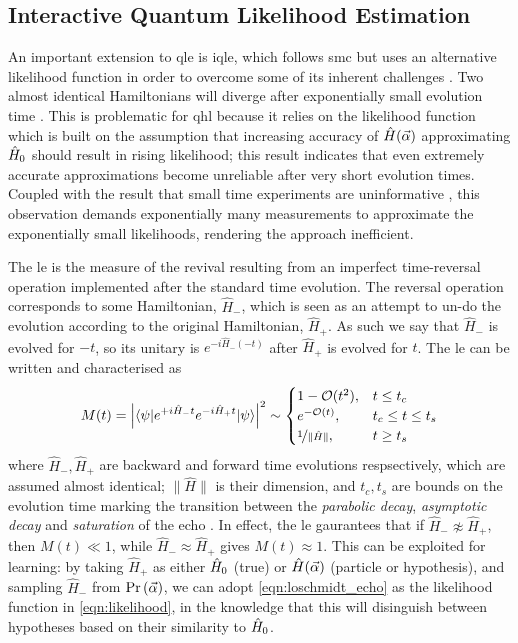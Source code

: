 \subsection{Interactive Quantum Likelihood Estimation}
An important extension to \gls{qle} is \gls{iqle}, 
    which follows \gls{smc} but uses an alternative \gls{likelihood} function in order to 
    overcome some of its inherent challenges \cite{Wiebe:2014qhl}. 
Two almost identical Hamiltonians will diverge after exponentially small evolution time \cite{jalabert2001environment}.
This is problematic for \gls{qhl} because it relies on the likelihood function which is built on the assumption 
    that increasing accuracy of $\hat{H}(\vec{\alpha})$ approximating $\hat{H}_0$ should result in rising likelihood;
    this result indicates that even extremely accurate approximations become unreliable after very short evolution times. 
Coupled with the result that small time experiments are uninformative \cite{wiebe2015quantum}, 
    this observation demands exponentially many measurements to approximate the exponentially small likelihoods, 
    rendering the approach inefficient. 
\par 
The \gls{le} is the measure of the revival resulting from an imperfect time-reversal operation implemented after the standard time evolution. 
The reversal operation corresponds to some Hamiltonian, $\hat{H}_{-}$, which is seen as an attempt to un-do the evolution
    according to the original Hamiltonian, $\hat{H}_{+}$. 
As such we say that $\hat{H}_{-}$ is evolved for $-t$, so its unitary is $e^{-i \hat{H}_{-}(-t)}$ after $\hat{H}_{+}$ is evolved for $t$. 
The \gls{le} can be written and characterised as 
\begin{align}
    \label{eqn:loschmidt_echo}
    M(t) = \left\lvert  \braket{ \psi | e^{+i\hat{H}_{-} t} e^{-i \hat{H}_{+} t} | \psi}  \right\rvert^2 \sim 
    \begin{cases}
        1 - \mathcal{O}(t^2),  & t \leq t_c \\
        e^{-\mathcal{O}(t)}, & t_c \leq t \leq t_{s} \\
        \nicefrac{1}{\| \hat{H} \|}, & t \geq t_{s}
    \end{cases}
\end{align}
    where $\hat{H}_{-}, \hat{H}_{+}$ are backward and forward time evolutions respsectively, which are assumed almost identical;
    $\|\hat{H}\|$ is their dimension, and $t_c, t_{s}$ are bounds on the evolution time marking the transition between the 
    \emph{parabolic decay}, \emph{asymptotic decay} and \emph{saturation} of the echo \cite{goussev2012loschmidt}. 
In effect, the \gls{le} gaurantees that if $\hat{H}_{-} \not\approx \hat{H}_{+}$, then $M(t) \ll 1$, 
    while $\hat{H}_{-} \approx \hat{H}_{+}$ gives $M(t) \approx 1$. 
This can be exploited for learning: 
    by taking $\hat{H}_{+}$ as either $\hat{H}_0$ (true) or $\hat{H}(\vec{\alpha})$ (particle or hypothesis), 
    and sampling $\hat{H}_{-}$ from $\Pr\left(\vec{\alpha}\right)$, 
    we can adopt \cref{eqn:loschmidt_echo} as the likelihood function in \cref{eqn:likelihood}, 
    in the knowledge that this will disinguish between hypotheses based on their similarity to $\hat{H}_0$.
\par 

